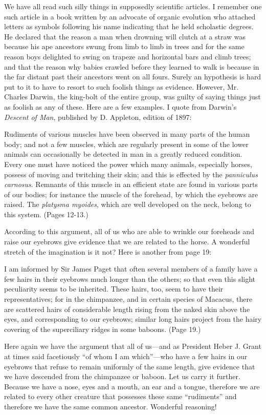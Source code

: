 We have all read such silly things in supposedly scientific articles. I remember one such
article in a book written by an advocate of organic evolution who attached letters as symbols
following his name indicating that he held scholastic degrees. He declared that the reason a
man when drowning will clutch at a straw was because his ape ancestors swung from limb to
limb in trees and for the same reason boys delighted to swing on trapeze and horizontal bars
and climb trees; and that the reason why babies crawled before they learned to walk is
because in the far distant past their ancestors went on all fours. Surely an hypothesis is hard
put to it to have to resort to such foolish things as evidence. However, Mr. Charles Darwin,
the king-bolt of the entire group, was guilty of saying things just as foolish as any of these.
Here are a few examples. I quote from Darwin's \textit{Descent of Man}, published by D. Appleton,
edition of 1897:

Rudiments of various muscles have been observed in many parts of the human body; and not
a few muscles, which are regularly present in some of the lower animals can occasionally be
detected in man in a greatly reduced condition. Every one must have noticed the power
which many animals, especially horses, possess of moving and twitching their skin; and this
is effected by the \textit{panniculus carnosus}. Remnants of this muscle in an efficient state are
found in various parts of our bodies; for instance the muscle of the forehead, by which the
eyebrows are raised. The \textit{platysma myoides}, which are well developed on the neck, belong to
this system. (Pages 12-13.)

According to this argument, all of us who are able to wrinkle our foreheads and raise our
eyebrows give evidence that we are related to the horse. A wonderful stretch of the
imagination is it not? Here is another from page 19:

I am informed by Sir James Paget that often several members of a family have a few hairs in
their eyebrows much longer than the others; so that even this slight peculiarity seems to be
inherited. These hairs, too, seem to have their representatives; for in the chimpanzee, and in
certain species of Macacus, there are scattered hairs of considerable length rising from the
naked skin above the eyes, and corresponding to our eyebrows; similar long hairs project
from the hairy covering of the superciliary ridges in some baboons. (Page 19.)

Here again we have the argument that all of us—and as President Heber J. Grant at times said
facetiously ``of whom I am which''—who have a few hairs in our eyebrows that refuse to
remain uniformly of the same length, give evidence that we have descended from the
chimpanzee or baboon. Let us carry it further. Because we have a nose, eyes and a mouth, an
ear and a tongue, therefore we are related to every other creature that possesses these same
``rudiments'' and therefore we have the same common ancestor. Wonderful reasoning!

